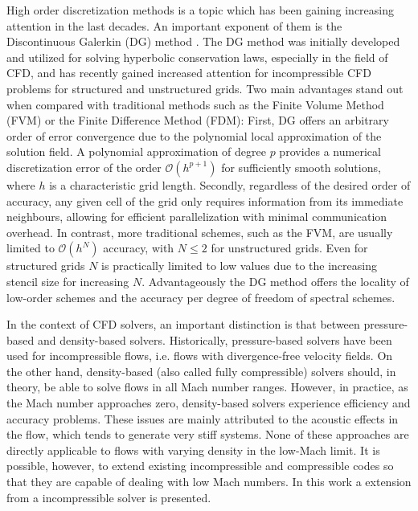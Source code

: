 High order discretization methods is a topic which has been gaining increasing attention in the last decades. An important exponent of them is the Discontinuous Galerkin (DG) method \textcite{cockburnDevelopmentDiscontinuousGalerkin2000}. The DG method was initially developed and utilized for solving hyperbolic conservation laws, especially in the field of \gls{CFD}, and has recently gained increased attention for incompressible CFD problems for structured and unstructured grids. Two main advantages stand out when compared with traditional methods such as the Finite Volume Method (FVM) or the Finite Difference Method (FDM): First, DG offers an arbitrary order of error convergence due to the polynomial local approximation of the solution field. A polynomial approximation of degree $p$ provides a numerical discretization error of the order  $\mathcal{O}(h^{p+1})$ for sufficiently smooth solutions, where $h$ is a characteristic grid length.
Secondly, regardless of the desired order of accuracy, any given cell of the grid only requires information from its immediate neighbours, allowing for efficient parallelization with minimal communication overhead. In contrast, more traditional schemes, such as the FVM, are usually limited to $\mathcal{O}(h^N)$ accuracy, with $N \leq 2$ for unstructured grids. Even for structured grids $N$ is practically limited to low values due to the increasing stencil size for increasing $N$. Advantageously the DG method offers the locality of low-order schemes and the accuracy per degree of freedom of spectral schemes.

In the context of CFD solvers, an important distinction is that between pressure-based and density-based solvers. Historically, pressure-based solvers have been used for incompressible flows, i.e. flows with divergence-free velocity fields. On the other hand, density-based (also called fully compressible) solvers should, in theory, be able to solve flows in all Mach number ranges. However, in practice, as the Mach number approaches zero, density-based solvers experience efficiency and accuracy problems. These issues are mainly attributed to the acoustic effects in the flow, which tends to generate very stiff systems. None of these approaches are directly applicable to flows with varying density in the low-Mach limit. \textcite{henninkPressurebasedSolverLowMach2021} It is possible, however, to extend existing incompressible and compressible codes so that they are capable of dealing with low Mach numbers. \textcite{keshtibanCompressibleFlowSolvers2003} In this work a extension from a incompressible solver is presented.

